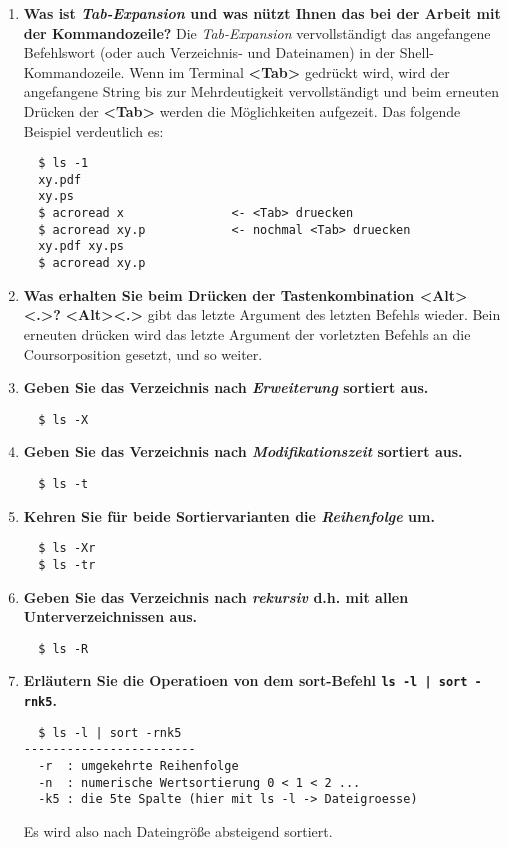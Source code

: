 \documentclass[
   draft=false
  ,paper=a4
  ,twoside=false
  ,fontsize=11pt
  ,headsepline
  ,BCOR10mm
  ,DIV11
  ,parskip=full+
]{scrartcl} %
\begin{document}
\begin{enumerate}
  \item \textbf{Was ist \emph{Tab-Expansion} und was nützt Ihnen das bei der
  Arbeit mit der Kommandozeile?}\newline
  Die \emph{Tab-Expansion} vervollständigt das angefangene Befehlswort (oder
  auch Verzeichnis- und Dateinamen) in der Shell-Kommandozeile. Wenn im
  Terminal \textbf{<Tab>} gedrückt wird, wird der angefangene String bis zur
  Mehrdeutigkeit vervollständigt und beim erneuten Drücken der \textbf{<Tab>}
  werden die Möglichkeiten aufgezeit. Das folgende Beispiel verdeutlich es:
  \begin{verbatim}
  $ ls -1
  xy.pdf
  xy.ps
  $ acroread x               <- <Tab> druecken
  $ acroread xy.p            <- nochmal <Tab> druecken
  xy.pdf xy.ps
  $ acroread xy.p
  \end{verbatim}

  \item \textbf{Was erhalten Sie beim Drücken der Tastenkombination
  \textbf{<Alt><.>}?}\newline
  \textbf{<Alt><.>} gibt das letzte Argument des letzten Befehls wieder.
  Bein erneuten drücken wird das letzte Argument der vorletzten Befehls
  an die Coursorposition gesetzt, und so weiter.

  \item \textbf{Geben Sie das Verzeichnis nach \emph{Erweiterung} sortiert aus.
  }
  \begin{verbatim}
  $ ls -X
  \end{verbatim}

  \item \textbf{Geben Sie das Verzeichnis nach \emph{Modifikationszeit}
  sortiert aus.}
  \begin{verbatim}
  $ ls -t
  \end{verbatim}

  \item \textbf{Kehren Sie für beide Sortiervarianten die \emph{Reihenfolge}
  um.}
  \begin{verbatim}
  $ ls -Xr
  $ ls -tr
  \end{verbatim}

  \item \textbf{Geben Sie das Verzeichnis nach \emph{rekursiv} d.h. mit allen
  Unterverzeichnissen aus.}
  \begin{verbatim}
  $ ls -R
  \end{verbatim}

  \item \textbf{Erläutern Sie die Operatioen von dem sort-Befehl
  \texttt{ls -l | sort -rnk5}.}
  \begin{verbatim}
  $ ls -l | sort -rnk5
------------------------
  -r  : umgekehrte Reihenfolge
  -n  : numerische Wertsortierung 0 < 1 < 2 ...
  -k5 : die 5te Spalte (hier mit ls -l -> Dateigroesse)
  \end{verbatim}
  Es wird also nach Dateingröße absteigend sortiert.


\end{enumerate}
\end{document}
